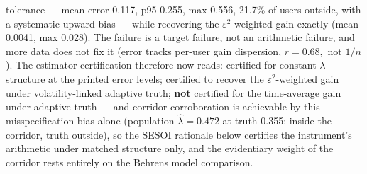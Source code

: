 \documentclass[
]{article}
\begin{document}
tolerance --- mean error 0.117, p95 0.255, max 0.556, 21.7\% of users
outside, with a systematic upward bias --- while recovering the
\(\varepsilon^{2}\)-weighted gain exactly (mean 0.0041, max 0.028). The
failure is a target failure, not an arithmetic failure, and more data
does not fix it (error tracks per-user gain dispersion, \(r = 0.68,\)
not \(1/n\)). The estimator certification therefore now reads: certified
for constant-\(\lambda\) structure at the printed error levels;
certified to recover the \(\varepsilon^{2}\)-weighted gain under
volatility-linked adaptive truth; \textbf{not} certified for the
time-average gain under adaptive truth --- and corridor corroboration is
achievable by this misspecification bias alone (population
\(\hat{\lambda} = 0.472\) at truth 0.355: inside the corridor, truth
outside), so the SESOI rationale below certifies the instrument's
arithmetic under matched structure only, and the evidentiary weight of
the corridor rests entirely on the Behrens model comparison.
\end{document}

